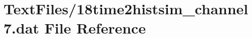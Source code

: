 \hypertarget{18time2histsim__channel7_8dat}{}\section{Text\+Files/18time2histsim\+\_\+channel7.dat File Reference}
\label{18time2histsim__channel7_8dat}
